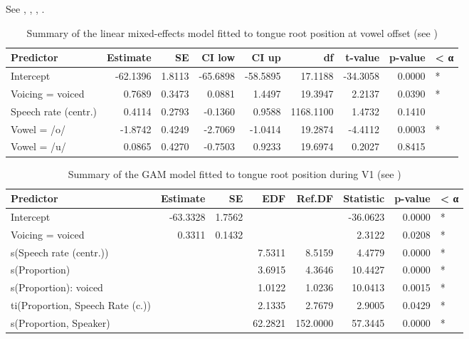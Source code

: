 \documentclass[12pt,]{article}
\begin{document}
See , ,
, .

\begin{table}[t]

\caption{\label{tab:tra-lm-table}Summary of the linear mixed-effects model fitted to tongue root position at vowel offset (see )}
\centering
\fontsize{10}{12}\selectfont
\begin{tabular}{lrrrrrrrl}
\toprule
Predictor & Estimate & SE & CI low & CI up & df & t-value & p-value & < α\\
\midrule
Intercept & -62.1396 & 1.8113 & -65.6898 & -58.5895 & 17.1188 & -34.3058 & 0.0000 & *\\
Voicing = voiced & 0.7689 & 0.3473 & 0.0881 & 1.4497 & 19.3947 & 2.2137 & 0.0390 & *\\
Speech rate (centr.) & 0.4114 & 0.2793 & -0.1360 & 0.9588 & 1168.1100 & 1.4732 & 0.1410 & \\
Vowel = /o/ & -1.8742 & 0.4249 & -2.7069 & -1.0414 & 19.2874 & -4.4112 & 0.0003 & *\\
Vowel = /u/ & 0.0865 & 0.4270 & -0.7503 & 0.9233 & 19.6974 & 0.2027 & 0.8415 & \\
\bottomrule
\end{tabular}
\end{table}

\begin{table}[t]

\caption{\label{tab:tra-gam-ar-table}Summary of the GAM model fitted to tongue root position during V1 (see )}
\centering
\fontsize{10}{12}\selectfont
\begin{tabular}{lrrrrrrl}
\toprule
Predictor & Estimate & SE & EDF & Ref.DF & Statistic & p-value & < α\\
\midrule
Intercept & -63.3328 & 1.7562 &  &  & -36.0623 & 0.0000 & *\\
Voicing = voiced & 0.3311 & 0.1432 &  &  & 2.3122 & 0.0208 & *\\
s(Speech rate (centr.)) &  &  & 7.5311 & 8.5159 & 4.4779 & 0.0000 & *\\
s(Proportion) &  &  & 3.6915 & 4.3646 & 10.4427 & 0.0000 & *\\
s(Proportion): voiced &  &  & 1.0122 & 1.0236 & 10.0413 & 0.0015 & *\\
ti(Proportion, Speech Rate (c.)) &  &  & 2.1335 & 2.7679 & 2.9005 & 0.0429 & *\\
s(Proportion, Speaker) &  &  & 62.2821 & 152.0000 & 57.3445 & 0.0000 & *\\
\bottomrule
\end{tabular}
\end{table}
\end{document}
